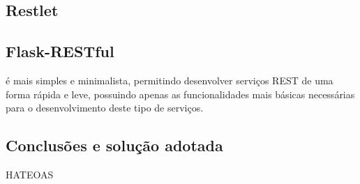 \subsection{Restlet}



\subsection{Flask-RESTful}


é mais simples e minimalista, permitindo desenvolver serviços REST de
uma forma rápida e leve, possuindo apenas as funcionalidades mais básicas necessárias para o
desenvolvimento deste tipo de serviços.




\subsection{Conclusões e solução adotada}

\ac{HATEOAS}

